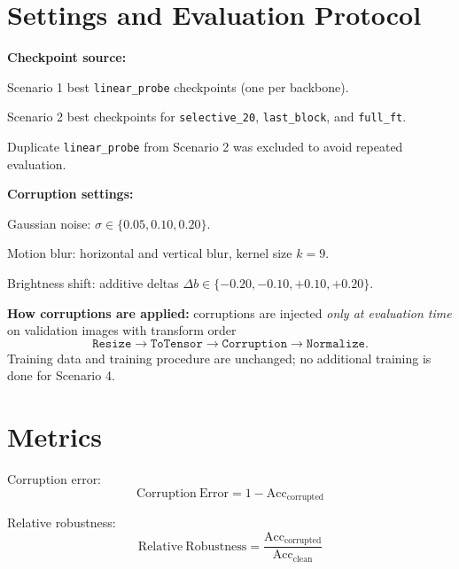 \documentclass[11pt,a4paper]{report}
\renewenvironment{leftbar}[1][\hsize]
  {\def\FrameCommand{{\color{subsectionblue}\vrule width 3pt}\hspace{0pt}}%
   \MakeFramed{\hsize#1\advance\hsize-\width\FrameRestore}}
  {\endMakeFramed}
\renewenvironment{itemize}{\begin{leftbar}\begin{originalitemize}}{\end{originalitemize}\end{leftbar}}
\begin{document}
\section{Settings and Evaluation Protocol}
\textbf{Checkpoint source:}
\begin{itemize}
  \item Scenario 1 best \texttt{linear\_probe} checkpoints (one per backbone).
  \item Scenario 2 best checkpoints for \texttt{selective\_20}, \texttt{last\_block}, and \texttt{full\_ft}.
  \item Duplicate \texttt{linear\_probe} from Scenario 2 was excluded to avoid repeated evaluation.
\end{itemize}

\textbf{Corruption settings:}
\begin{itemize}
  \item Gaussian noise: $\sigma \in \{0.05, 0.10, 0.20\}$.
  \item Motion blur: horizontal and vertical blur, kernel size $k=9$.
  \item Brightness shift: additive deltas $\Delta b \in \{-0.20, -0.10, +0.10, +0.20\}$.
\end{itemize}

\textbf{How corruptions are applied:} corruptions are injected \emph{only at evaluation time} on validation images with transform order
\[
\texttt{Resize} \rightarrow \texttt{ToTensor} \rightarrow \texttt{Corruption} \rightarrow \texttt{Normalize}.
\]
Training data and training procedure are unchanged; no additional training is done for Scenario 4.

\section{Metrics}
Corruption error:
\begin{equation}
\mathrm{Corruption\ Error} = 1 - \mathrm{Acc}_{\mathrm{corrupted}}
\end{equation}

Relative robustness:
\begin{equation}
\mathrm{Relative\ Robustness} = \frac{\mathrm{Acc}_{\mathrm{corrupted}}}{\mathrm{Acc}_{\mathrm{clean}}}
\end{equation}
\end{document}
